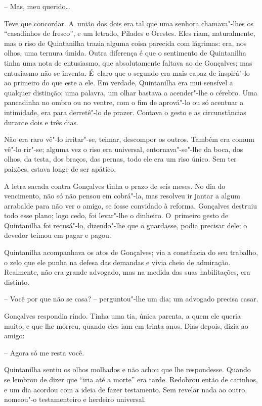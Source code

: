 -- Mas, meu querido\ldots{}

Teve que concordar. A~união dos dois era tal que uma senhora
chamava"-lhes os ``casadinhos de fresco'', e um letrado, Pílades e
Orestes. Eles riam, naturalmente, mas o riso de Quintanilha trazia
alguma coisa parecida com lágrimas: era, nos olhos, uma ternura úmida.
Outra diferença é que o sentimento de Quintanilha tinha uma nota de
entusiasmo, que absolutamente faltava ao de Gonçalves; mas entusiasmo
não se inventa. É~claro que o segundo era mais capaz de inspirá"-lo ao
primeiro do que este a ele. Em verdade, Quintanilha era mui sensível a
qualquer distinção; uma palavra, um olhar bastava a acender"-lhe o
cérebro. Uma pancadinha no ombro ou no ventre, com o fim de aprová"-lo ou
só acentuar a intimidade, era para derretê"-lo de prazer. Contava o gesto
e as circunstâncias durante dois e três dias.

Não era raro vê"-lo irritar"-se, teimar, descompor os outros. Também era
comum vê"-lo rir"-se; alguma vez o riso era universal, entornava"-se"-lhe da
boca, dos olhos, da testa, dos braços, das pernas, todo ele era um riso
único. Sem ter paixões, estava longe de ser apático.

A letra sacada contra Gonçalves tinha o prazo de seis meses. No dia do
vencimento, não só não pensou em cobrá"-la, mas resolveu ir jantar a
algum arrabalde para não ver o amigo, se fosse convidado à reforma.
Gonçalves destruiu todo esse plano; logo cedo, foi levar"-lhe o dinheiro.
O~primeiro gesto de Quintanilha foi recusá"-lo, dizendo"-lhe que o
guardasse, podia precisar dele; o devedor teimou em pagar e pagou.

Quintanilha acompanhava os atos de Gonçalves; via a constância do seu
trabalho, o zelo que ele punha na defesa das demandas e vivia cheio de
admiração. Realmente, não era grande advogado, mas na medida das suas
habilitações, era distinto.

-- Você por que não se casa? -- perguntou"-lhe um dia; um advogado
precisa casar.

Gonçalves respondia rindo. Tinha uma tia, única parenta, a quem ele
queria muito, e que lhe morreu, quando eles iam em trinta anos. Dias
depois, dizia ao amigo:

-- Agora só me resta você.

Quintanilha sentiu os olhos molhados e não achou que lhe respondesse.
Quando se lembrou de dizer que ``iria até a morte'' era tarde. Redobrou
então de carinhos, e um dia acordou com a ideia de fazer testamento. Sem
revelar nada ao outro, nomeou"-o testamenteiro e herdeiro universal.

